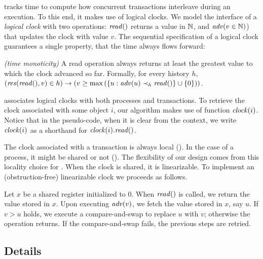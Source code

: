 
 tracks time to compute how concurrent transactions interleave during an execution.
To this end, it makes use of logical clocks.
We model the interface of a \emph{logical clock} with two operations:
$\cread$ returns a value in $\naturalSet$, and
$\cadv(v \in \naturalSet)$) that updates the clock with value $v$.
The sequential specification of a logical clock guarantees a single property, that the time always flows forward:
\begin{inparaenum}
\item[\emph{(time monoticity)}]
  A read operation always returns at least the greatest value to which the clock advanced so far.
  Formally, for every history $h$, $(\responseAny{\cread}{v} \in h) \implies (v \geq \max{(\{u : \cadv(u) \hb_h \cread \} \union \{0\})})$.
\end{inparaenum}

 associates logical clocks with both processes and transactions.
To retrieve the clock associated with some object $i$, our algorithm makes use of function $\clockOf{i}$.
Notice that in the pseudo-code, when it is clear from the context, 
we write $\clockOf{i}$ as a shorthand for $\clockOf{i}.\mathit{read}()$.

The clock associated with a transaction is always local ().
In the case of a process, it might be shared or not ().
The flexibility of our design comes from this locality choice for .
When the clock is shared, it is linearizable.
To implement an (obstruction-free) linearizable clock we proceeds as follows.
\begin{construction}
  Let $x$ be a shared register initialized to $0$.
  When $\cread$ is called, we return the value stored in $x$.
  Upon executing $\cadv(v)$, we fetch the value stored in $x$, say $u$.
  If $v > u$ holds, we execute a compare-and-swap to replace $u$ with $v$; 
  otherwise the operation returns.
  If the compare-and-swap fails, the previous steps are retried.
\end{construction}



\subsection{Details}

